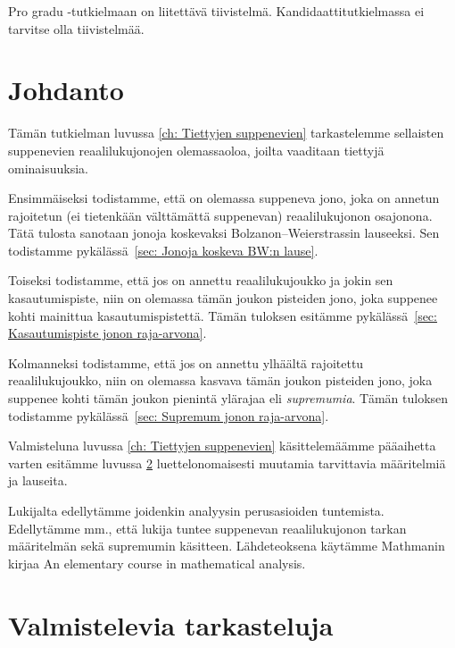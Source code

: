 \documentclass[a4paper,12pt,leqno,oneside]{report} %
\theoremstyle{plain}
\theoremstyle{definition}
\theoremstyle{remark}
\numberwithin{equation}{chapter}
\begin{document}
Pro gradu -tutkielmaan on liitettävä tiivistelmä. Kandidaattitutkielmassa ei tarvitse olla tiivistelmää.

\cleardoublepage


\tableofcontents

\cleardoublepage


\chapter{Johdanto}

Tämän tutkielman luvussa \ref{ch: Tiettyjen suppenevien} tarkastelemme sellaisten suppenevien reaalilukujonojen olemassaoloa, joilta vaaditaan tiettyjä ominaisuuksia.

Ensimmäiseksi todistamme, että on olemassa suppeneva jono, joka on annetun rajoitetun (ei tietenkään välttämättä suppenevan) reaalilukujonon osajonona. Tätä tulosta sanotaan jonoja koskevaksi Bolzanon--Weierstrassin lauseeksi. Sen todistamme pykälässä~\ref{sec: Jonoja koskeva BW:n lause}.

Toiseksi todistamme, että jos on annettu reaalilukujoukko ja jokin sen kasautumispiste, niin on olemassa tämän joukon pisteiden jono, joka suppenee kohti mainittua kasautumispistettä. Tämän tuloksen esitämme pykälässä~\ref{sec: Kasautumispiste jonon raja-arvona}.

Kolmanneksi todistamme, että jos on annettu ylhäältä rajoitettu reaalilukujoukko, niin on olemassa kasvava tämän joukon pisteiden jono, joka suppenee kohti tämän joukon pienintä ylärajaa eli \emph{supremumia}. Tämän tuloksen todistamme pykälässä~\ref{sec: Supremum jonon raja-arvona}.

Valmisteluna luvussa \ref{ch: Tiettyjen suppenevien} käsittelemäämme pääaihetta varten esitämme luvussa \ref{ch: Valmistelevia tarkasteluja} luettelonomaisesti muutamia tarvittavia määritelmiä ja lauseita.

Lukijalta edellytämme joidenkin analyysin perusasioiden tuntemista. Edellytämme mm., että lukija tuntee suppenevan reaalilukujonon tarkan määritelmän sekä supremumin käsitteen. Lähdeteoksena käytämme Mathmanin kirjaa An elementary course in mathematical analysis.


\chapter{Valmistelevia tarkasteluja}\label{ch: Valmistelevia tarkasteluja}
\end{document}
